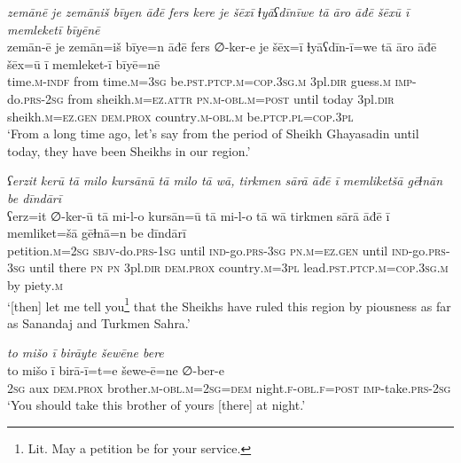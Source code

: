 \ea \label{DG.8}
\textit{zemānē je zemāniš bīyen āđē fers kere je šēxī ɫyāʕdīnīwe tā āro āđē šēxū ī memleketī bīyēnē} \\ 
\gll zemān-ē je zemān=iš bīye=n āđē fers ∅-ker-e je šēx=ī ɫyāʕdīn-ī=we tā āro āđē šēx=ū ī memleket-ī bīyē=nē \\ 
 time\textsc{.m}\textsc{-indf} from time\textsc{.m}\textsc{=3sg} be\textsc{.pst}\textsc{.ptcp}\textsc{.m}\textsc{=cop}\textsc{.3sg}\textsc{.m} 3pl\textsc{.dir} guess\textsc{.m} \textsc{imp-}do\textsc{.prs}-\textsc{2sg} from sheikh\textsc{.m}\textsc{=ez}.\textsc{attr} \textsc{pn}\textsc{.m}\textsc{-obl}\textsc{.m}\textsc{=\textsc{post}} until today 3pl\textsc{.dir} sheikh\textsc{.m}\textsc{=ez}\textsc{.gen} \textsc{dem.prox} country\textsc{.m}\textsc{-obl}\textsc{.m} be\textsc{.ptcp}\textsc{.pl}\textsc{=cop}\textsc{.3pl} \\ 
\glt `From a long time ago, let’s say from the period of Sheikh Ghayasadin until today, they have been Sheikhs in our region.'
\z 
 
\ea \label{DG.10}
\textit{ʕerzit kerū tā milo kursānū tā milo tā wā, tirkmen sārā āđē ī memliketšā gēɫnān be dīndārī} \\ 
\gll ʕerz=it ∅-ker-ū tā mi-l-o kursān=ū tā mi-l-o tā wā tirkmen sārā āđē ī memliket=šā gēɫnā=n be dīndārī \\ 
 petition\textsc{.m}\textsc{=\textsc{2sg}} \textsc{sbjv-}do\textsc{.prs}\textsc{-1sg} until \textsc{ind-}go\textsc{.prs}\textsc{-3sg} \textsc{pn}\textsc{.m}\textsc{=ez}\textsc{.gen} until \textsc{ind-}go\textsc{.prs}\textsc{-3sg} until there \textsc{pn} \textsc{pn} 3pl\textsc{.dir} \textsc{dem.prox} country\textsc{.m}\textsc{=3pl} lead\textsc{.pst}\textsc{.ptcp}\textsc{.m}\textsc{=cop}\textsc{.3sg}\textsc{.m} by piety\textsc{.m} \\ 
\glt `[then] let me tell you\footnote{Lit. May a petition be for your service.} that the Sheikhs have ruled this region by piousness as far as Sanandaj and Turkmen Sahra.'
\z 
 
\ea \label{DG.26}
\textit{to mišo ī birāyte šewēne bere} \\ 
\gll to mišo ī birā-ī=t=e šewe-ē=ne ∅-ber-e \\ 
 \textsc{2sg} aux \textsc{dem.prox} brother\textsc{.m}\textsc{-obl}\textsc{.m}\textsc{=\textsc{2sg}}\textsc{=dem} night\textsc{\textsc{.f}}\textsc{-obl}\textsc{\textsc{.f}}\textsc{=\textsc{post}} \textsc{imp-}take\textsc{.prs}-\textsc{2sg} \\ 
\glt `You should take this brother of yours [there] at night.'
\z 
 
